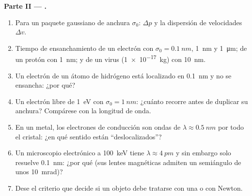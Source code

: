 \begin{problem}
\textbf{Parte II --- .}
\begin{enumerate}[resume]
  \item Para un paquete gaussiano de anchura $\sigma_0$: $\Delta p$ y la
        dispersión de velocidades $\Delta v$.
  \item Tiempo de ensanchamiento de un electrón con $\sigma_0 = \qty{0.1}{nm}$,
        \qty{1}{nm} y \qty{1}{\micro m}; de un protón con \qty{1}{nm}; y de un
        virus (\qty{1e-17}{kg}) con \qty{10}{nm}.
  \item Un electrón de un átomo de hidrógeno está localizado en \qty{0.1}{nm}
        y no se ensancha: ¿por qué?
  \item Un electrón libre de \qty{1}{eV} con $\sigma_0 = \qty{1}{nm}$: ¿cuánto
        recorre antes de duplicar su anchura? Compárese con la
        longitud de onda.
  \item En un metal, los electrones de conducción son ondas de $\lambda \approx
        \qty{0.5}{nm}$ por todo el cristal: ¿en qué sentido están
        ``deslocalizados''?
  \item Un microscopio electrónico a \qty{100}{keV} tiene $\lambda \approx
        \qty{4}{pm}$ y sin embargo solo resuelve \qty{0.1}{nm}: ¿por qué (sus lentes
        magnéticas admiten un semiángulo de unos \qty{10}{mrad})?
  \item Dese el criterio que decide si un objeto debe tratarse
        con una  o con Newton.
\end{enumerate}


\end{problem}
